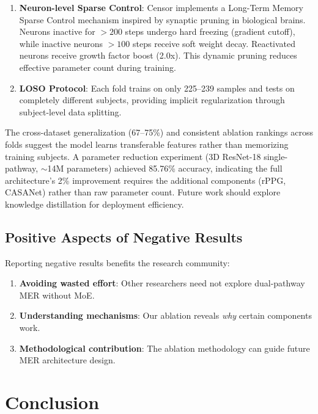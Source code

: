 \documentclass[preprint,12pt,authoryear]{elsarticle}
\begin{document}
\begin{enumerate}
\begin{enumerate}
\item \textbf{Neuron-level Sparse Control}: Censor implements a Long-Term Memory Sparse Control mechanism inspired by synaptic pruning in biological brains. Neurons inactive for $>200$ steps undergo hard freezing (gradient cutoff), while inactive neurons $>100$ steps receive soft weight decay. Reactivated neurons receive growth factor boost (2.0x). This dynamic pruning reduces effective parameter count during training.

\item \textbf{LOSO Protocol}: Each fold trains on only 225--239 samples and tests on completely different subjects, providing implicit regularization through subject-level data splitting.
\end{enumerate}

The cross-dataset generalization (67--75\%) and consistent ablation rankings across folds suggest the model learns transferable features rather than memorizing training subjects. A parameter reduction experiment (3D ResNet-18 single-pathway, $\sim$14M parameters) achieved 85.76\% accuracy, indicating the full architecture's 2\% improvement requires the additional components (rPPG, CASANet) rather than raw parameter count. Future work should explore knowledge distillation for deployment efficiency.
\end{enumerate}

\subsection{Positive Aspects of Negative Results}

Reporting negative results benefits the research community:

\begin{enumerate}
\item \textbf{Avoiding wasted effort}: Other researchers need not explore dual-pathway MER without MoE.
\item \textbf{Understanding mechanisms}: Our ablation reveals \textit{why} certain components work.
\item \textbf{Methodological contribution}: The ablation methodology can guide future MER architecture design.
\end{enumerate}

\section{Conclusion}
\end{document}
